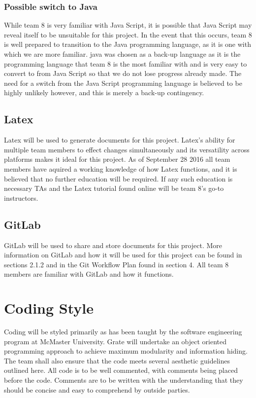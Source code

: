\documentclass{article}
\begin{document}
\subsubsection{Possible switch to Java}

While team 8 is very familiar with Java Script, it is possible that Java Script may reveal itself to be unsuitable for this project. In the event that this occurs, team 8 is well prepared to transition to the Java programming language, as it is one with which we are more familiar. java was chosen as a back-up language as it is the programming language that team 8 is the most familiar with and is very easy to convert to from Java Script so that we do not lose progress already made. The need for a switch from the Java Script programming language is believed to be highly unlikely however, and this is merely a back-up contingency.

\subsection{Latex}

Latex will be used to generate documents for this project. Latex's ability for multiple team members to effect changes simultaneously and its versatility across platforms makes it ideal for this project. As of September 28 2016 all team members have aquired a working knowledge of how Latex functions, and it is believed that no further education will be required. If any such education is necessary TAs and the Latex tutorial found online will be team 8's go-to instructors. 

\subsection{GitLab}

GitLab will be used to share and store documents for this project. More information on GitLab and how it will be used for this project can be found in sections 2.1.2 and in the Git Workflow Plan found in section 4. All team 8 members are familiar with GitLab and how it functions. 

\section{Coding Style}

Coding will be styled primarily as has been taught by the software engineering 
program at McMaster University. Grate will undertake an object oriented 
programming approach to achieve maximum modularity and information hiding. The 
team shall also ensure that the code meets several aesthetic guidelines outlined 
here. All code is to be well commented, with comments being placed before the 
code. Comments are to be written with the understanding that they should be 
concise and easy to comprehend by outside parties. 
\end{document}
